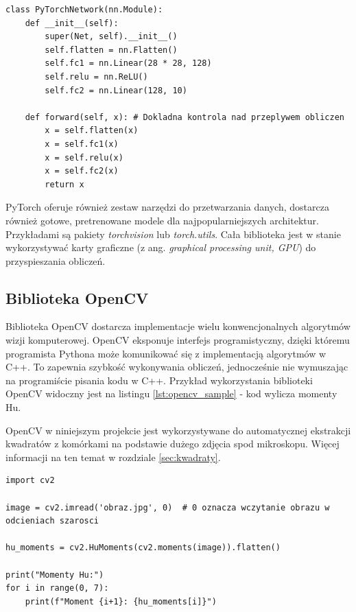 \begin{lstlisting}[language=ipython,caption={Przykładowa sieć neuronowa w PyTorch},label={lst:pytorch_sample}]
class PyTorchNetwork(nn.Module):
    def __init__(self):
        super(Net, self).__init__()
        self.flatten = nn.Flatten()
        self.fc1 = nn.Linear(28 * 28, 128)
        self.relu = nn.ReLU()
        self.fc2 = nn.Linear(128, 10)

    def forward(self, x): # Dokladna kontrola nad przeplywem obliczen
        x = self.flatten(x)
        x = self.fc1(x)
        x = self.relu(x)
        x = self.fc2(x)
        return x
\end{lstlisting}

PyTorch oferuje również zestaw narzędzi do przetwarzania danych, dostarcza również gotowe, pretrenowane modele dla najpopularniejszych architektur.
Przykładami są pakiety \textit{torchvision} lub \textit{torch.utils}. Cała biblioteka jest w stanie wykorzystywać karty graficzne (z ang. \textit{graphical processing unit, GPU}) do przyspieszania obliczeń.

\subsection{Biblioteka OpenCV}

Biblioteka OpenCV \cite{opencv} dostarcza implementacje wielu konwencjonalnych algorytmów wizji komputerowej.
OpenCV eksponuje interfejs programistyczny, dzięki któremu programista Pythona może komunikować się z implementacją algorytmów w C++.
To zapewnia szybkość wykonywania obliczeń, jednocześnie nie wymuszając na programiście pisania kodu w C++. Przykład wykorzystania biblioteki OpenCV widoczny jest na listingu \ref{lst:opencv_sample}
- kod wylicza momenty Hu.

OpenCV w niniejszym projekcie jest wykorzystywane do automatycznej ekstrakcji kwadratów z komórkami na podstawie dużego zdjęcia spod mikroskopu.
Więcej informacji na ten temat w rozdziale \ref{sec:kwadraty}.

\begin{lstlisting}[language=ipython,caption={Obliczenie momentów Hu z użyciem OpenCV}, label={lst:opencv_sample}]
import cv2

image = cv2.imread('obraz.jpg', 0)  # 0 oznacza wczytanie obrazu w odcieniach szarosci

hu_moments = cv2.HuMoments(cv2.moments(image)).flatten()

print("Momenty Hu:")
for i in range(0, 7):
    print(f"Moment {i+1}: {hu_moments[i]}")
\end{lstlisting}

